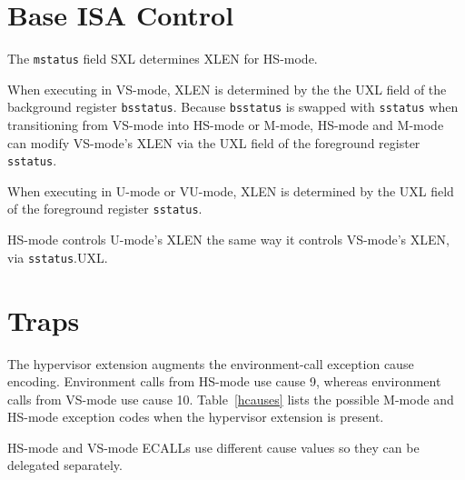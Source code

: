 \clearpage

\section{Base ISA Control}

The {\tt mstatus} field SXL determines XLEN for HS-mode.

When executing in VS-mode, XLEN is determined by the the UXL field of the
background register {\tt bsstatus}.  Because {\tt bsstatus} is swapped with
{\tt sstatus} when transitioning from VS-mode into HS-mode or M-mode, HS-mode
and M-mode can modify VS-mode's XLEN via the UXL field of the foreground
register {\tt sstatus}.

When executing in U-mode or VU-mode, XLEN is determined by the UXL field of the
foreground register {\tt sstatus}.

\begin{commentary}
HS-mode controls U-mode's XLEN the same way it controls VS-mode's XLEN, via
{\tt sstatus}.UXL.
\end{commentary}

\section{Traps}

The hypervisor extension augments the environment-call exception cause
encoding.  Environment calls from HS-mode use cause 9, whereas environment
calls from VS-mode use cause 10.  Table~\ref{hcauses} lists the
possible M-mode and HS-mode exception codes when the hypervisor extension is
present.

\begin{commentary}
HS-mode and VS-mode ECALLs use different cause values so they can be delegated
separately.
\end{commentary}

